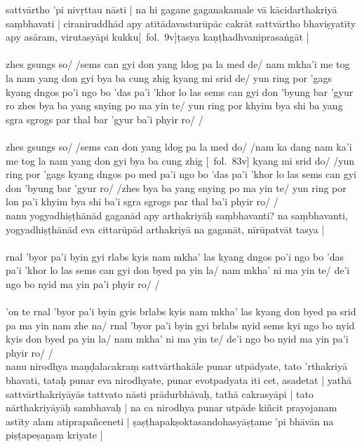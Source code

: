 \documentclass[12pt]{article}
\begin{document}
sattvārtho 'pi nivṛttau nāsti | na hi gagane gaganakamale vā kācidarthakriyā saṃbhavati | ciraniruddhād apy atītādavasturūpāc cakrāt sattvārtho bhaviṣyatīty apy asāram, virutasyāpi kukku[\MS\ fol.\ 9v]ṭasya kaṇṭhadhvaniprasaṅgāt |\\

\textbf{\TVA}\\
zhes gsungs so/ /sems can gyi don yang ldog pa la med de/ nam mkha'i me tog la nam yang don gyi bya ba cung zhig kyang mi srid de/ yun ring por 'gags kyang dngos po'i ngo bo 'das pa'i 'khor lo las sems can gyi don 'byung bar 'gyur ro zhes bya ba yang snying po ma yin te/ yun ring por khyim bya shi ba yang sgra sgrogs par thal bar 'gyur ba'i phyir ro/ /\\

\textbf{\TVB}\\
zhes gsungs so/ /sems can don yang ldog pa la med do/ /nam ka dang nam ka'i me tog la nam yang don gyi bya ba cung zhig [\TVB\ fol.\ 83v] kyang mi srid do/ /yun ring por 'gags kyang dngos po med pa'i ngo bo 'das pa'i 'khor lo las sems can gyi don 'byung bar 'gyur ro/ /zhes bya ba yang snying po ma yin te/ yun ring por lon pa'i khyim bya shi ba'i sgra sgrogs par thal ba'i phyir ro/ /\\

nanu yogyadhiṣṭhānād gaganād apy arthakriyāḥ saṃbhavanti? na saṃbhavanti, yogyadhiṣṭhānād eva cittarūpād arthakriyā na gaganāt, nīrūpatvāt tasya |\\

\textbf{\TVA}\\
rnal 'byor pa'i byin gyi rlabs kyis nam mkha' las kyang dngos po'i ngo bo 'das pa'i 'khor lo las sems can gyi don byed pa yin la/ nam mkha' ni ma yin te/ de'i ngo bo nyid ma yin pa'i phyir ro/ /\\

\textbf{\TVB}\\
'on te rnal 'byor pa'i byin gyis brlabs kyis nam mkha' las kyang don byed pa srid pa ma yin nam zhe na/ rnal 'byor pa'i byin gyi brlabs nyid sems kyi ngo bo nyid kyis don byed pa yin la/ nam mkha' ni ma yin te/ de'i ngo bo nyid ma yin pa'i phyir ro/ /\\

nanu nirodhya maṇḍalacakraṃ sattvārthakāle punar utpādyate, tato 'rthakriyā bhavati, tataḥ punar eva nirodhyate, punar evotpadyata iti cet, asadetat | yathā sattvārthakriyāyās tattvato nāsti prādurbhāvaḥ, tathā cakrasyāpi | tato nārthakriyāyāḥ sambhavaḥ | na ca nirodhya punar utpāde kiñcit prayojanam astīty alam atiprapañceneti | ṣaṣṭhapakṣoktasandohasyāṣṭame 'pi bhāvān na piṣṭapeṣaṇaṃ kriyate |\\
\end{document}
